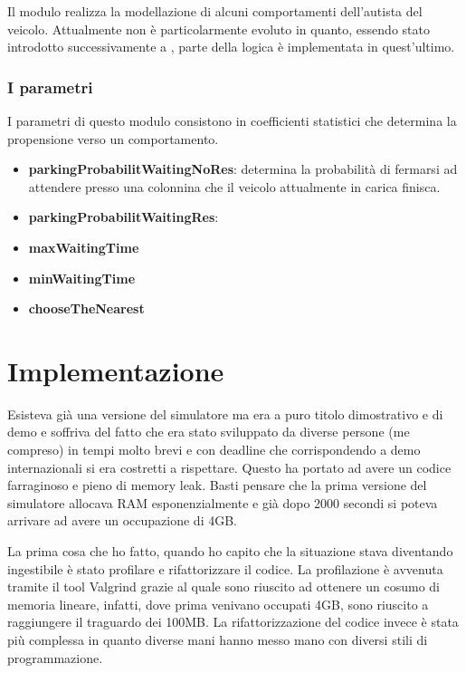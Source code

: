 Il modulo realizza la modellazione di alcuni comportamenti dell'autista del veicolo. Attualmente non è particolarmente evoluto in quanto, essendo stato introdotto successivamente a , parte della logica è implementata in quest'ultimo.

\subsubsection{I parametri}

I parametri di questo modulo consistono in coefficienti statistici che determina la propensione verso un comportamento.

\begin{itemize}
	\item \textbf{parkingProbabilitWaitingNoRes}: determina la probabilità di fermarsi ad attendere presso una colonnina che il veicolo attualmente in carica finisca.
	\item \textbf{parkingProbabilitWaitingRes}: 
	\item \textbf{maxWaitingTime}
	\item \textbf{minWaitingTime}
	\item \textbf{chooseTheNearest}
\end{itemize}



\section{Implementazione}

Esisteva già una versione del simulatore ma era a puro titolo dimostrativo e di demo e soffriva del fatto che era stato sviluppato da diverse persone (me compreso) in tempi molto brevi e con deadline che corrispondendo a demo internazionali si era costretti a rispettare. Questo ha portato ad avere un codice farraginoso e pieno di memory leak. Basti pensare che la prima versione del simulatore allocava RAM esponenzialmente e già dopo 2000 secondi si poteva arrivare ad avere un occupazione di 4GB.

La prima cosa che ho fatto, quando ho capito che la situazione stava diventando ingestibile è stato profilare e rifattorizzare il codice. La profilazione è avvenuta tramite il tool Valgrind grazie al quale sono riuscito ad ottenere un cosumo di memoria lineare, infatti, dove prima venivano occupati 4GB, sono riuscito a raggiungere il traguardo dei 100MB. La rifattorizzazione del codice invece è stata più complessa in quanto diverse mani hanno messo mano con diversi stili di programmazione. 

